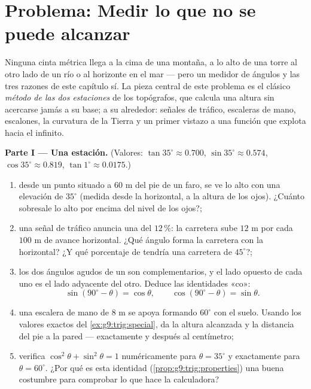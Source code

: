 \section{Problema: Medir lo que no se puede alcanzar}

\begin{problem}
\label{pb:g9:trig:1}
Ninguna cinta métrica llega a la cima de una montaña, a lo alto de una
torre al otro lado de un río o al horizonte en el mar --- pero un
medidor de ángulos y las tres razones de este capítulo sí. La pieza central de este
problema es el clásico \emph{método de las dos estaciones} de los topógrafos,
que calcula una altura sin acercarse jamás a su base;
a su alrededor: señales de tráfico, escaleras de mano, escalones, la curvatura de la
Tierra y un primer vistazo a una función que explota hacia el infinito.

\medskip
\noindent\textbf{Parte I --- Una estación.}
(Valores: $\tan 35^\circ \approx 0.700$,
$\sin 35^\circ \approx 0.574$, $\cos 35^\circ \approx 0.819$,
$\tan 1^\circ \approx 0.0175$.)
\begin{enumerate}
  \item desde un punto situado a $60$ m del pie de un faro, se ve
        lo alto con una elevación de $35^\circ$ (medida desde
        la horizontal, a la altura de los ojos). ¿Cuánto sobresale lo alto por encima
        del nivel de los ojos?;
  \item una señal de tráfico anuncia una  del $12\,\%$: la carretera sube
        $12$ m por cada $100$ m de avance horizontal. ¿Qué ángulo forma
        la carretera con la horizontal? ¿Y qué porcentaje de 
        tendría una carretera de $45^\circ$?;
  \item los dos ángulos agudos de un  son
        complementarios, y el lado opuesto de cada uno es el lado
        adyacente del otro. Deduce las identidades «co»:
        \[
        \sin(90^\circ - \theta) = \cos\theta,
        \qquad
        \cos(90^\circ - \theta) = \sin\theta .
        \]
  \item una escalera de mano de $8$ m se apoya formando $60^\circ$ con el suelo.
        Usando los valores exactos del \cref{ex:g9:trig:special},
        da la altura alcanzada y la distancia del pie
        a la pared --- exactamente y después al centímetro;
  \item verifica $\cos^2\theta + \sin^2\theta = 1$ numéricamente para
        $\theta = 35^\circ$ y exactamente para $\theta = 60^\circ$.
        ¿Por qué es esta identidad
        (\cref{prop:g9:trig:properties}) una buena costumbre para
        comprobar lo que hace la calculadora?
\end{enumerate}


\end{problem}
